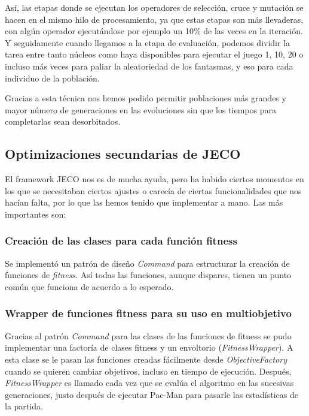 Así, las etapas donde se ejecutan los operadores de selección, cruce y mutación se hacen en el mismo hilo de procesamiento, ya que estas etapas son más llevaderas, con algún operador ejecutándose por ejemplo un 10\% de las veces en la iteración. Y seguidamente cuando llegamos a la etapa de evaluación, podemos dividir la tarea entre tanto núcleos como haya disponibles para ejecutar el juego 1, 10, 20 o incluso más veces para paliar la aleatoriedad de los fantasmas, y eso para cada individuo de la población.

Gracias a esta técnica nos hemos podido permitir poblaciones más grandes y mayor número de generaciones en las evoluciones sin que los tiempos para completarlas sean desorbitados.


\subsection{Optimizaciones secundarias de JECO}
El framework JECO nos es de mucha ayuda, pero ha habido ciertos momentos en los que se necesitaban ciertos ajustes o carecía de ciertas funcionalidades que nos hacían falta, por lo que las hemos tenido que implementar a mano. Las más importantes son:

\subsubsection{Creación de las clases para cada función fitness}
Se implementó un patrón de diseño \textit{Command} para estructurar la creación de funciones de \textit{fitness}. Así todas las funciones, aunque dispares, tienen un punto común que funciona de acuerdo a lo esperado.

\subsubsection{Wrapper de funciones fitness para su uso en multiobjetivo} \label{sec:multi}
Gracias al patrón \textit{Command} para las clases de las funciones de fitness se pudo implementar una factoría de clases fitness y un envoltorio (\textit{FitnessWrapper}). A esta clase se le pasan las funciones creadas fácilmente desde \textit{ObjectiveFactory} cuando se quieren cambiar objetivos, incluso en tiempo de ejecución. Después, \textit{FitnessWrapper} es llamado cada vez que se evalúa el algoritmo en las sucesivas generaciones, justo después de ejecutar Pac-Man para pasarle las estadísticas de la partida.

